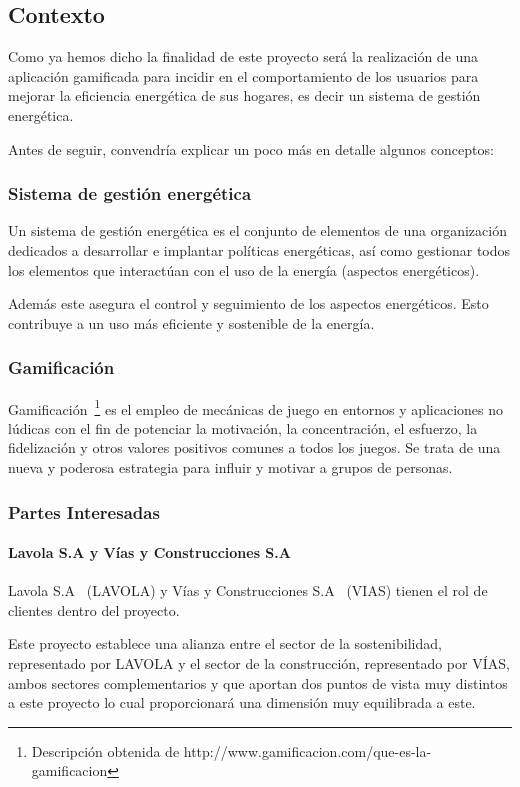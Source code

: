 \subsection{Contexto}
Como ya hemos dicho la finalidad de este proyecto será la realización de una aplicación gamificada para incidir en el comportamiento de los usuarios para mejorar la eficiencia energética de sus hogares, es decir un sistema de gestión energética.

Antes de seguir, convendría explicar un poco más en detalle algunos conceptos:

\subsubsection{Sistema de gestión energética}
Un sistema de gestión energética es el conjunto de elementos de una organización dedicados a desarrollar e implantar políticas energéticas, así como gestionar todos los elementos que interactúan con el uso de la energía (aspectos energéticos).

Además este asegura el control y seguimiento de los aspectos energéticos. Esto contribuye a un uso más eficiente y sostenible de la energía.
\subsubsection{Gamificación}
Gamificación~\footnote{Descripción obtenida de http://www.gamificacion.com/que-es-la-gamificacion} es el empleo de mecánicas de juego en entornos y aplicaciones no lúdicas con el fin de potenciar la motivación, la concentración, el esfuerzo, la fidelización y otros valores positivos comunes a todos los juegos. Se trata de una nueva y poderosa estrategia para influir y motivar a grupos de personas.

\subsubsection{Partes Interesadas}
\paragraph{Lavola S.A y Vías y Construcciones S.A}
Lavola S.A~\cite{lavola} (LAVOLA) y Vías y Construcciones S.A~\cite{vias} (VIAS) tienen el rol de clientes dentro del proyecto.

Este proyecto establece una alianza entre el sector de la sostenibilidad, representado por LAVOLA y el sector de la construcción, representado por VÍAS, ambos sectores complementarios y que aportan dos puntos de vista muy distintos a este proyecto lo cual proporcionará una dimensión muy equilibrada a este.

